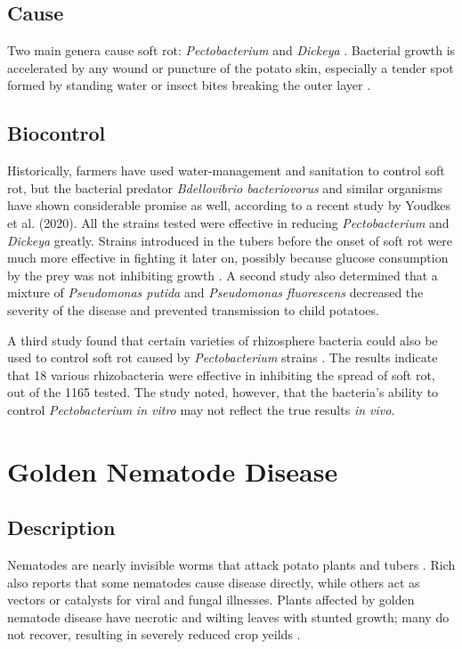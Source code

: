 \documentclass[letterpaper, 12pt]{report}
\begin{document}
\subsection{Cause}

Two main genera cause soft rot: \emph{Pectobacterium} and \emph{Dickeya} \autocite{youdkes2020potential}. Bacterial growth is accelerated by any wound or puncture of the potato skin, especially a tender spot formed by standing water or insect bites breaking the outer layer \autocite{rich2013potato}.

\subsection{Biocontrol}

Historically, farmers have used water-management and sanitation to control soft rot, but the bacterial predator \emph{Bdellovibrio bacteriovorus} and similar organisms have shown considerable promise as well, according to a recent study by Youdkes et al. (2020). All the strains tested were effective in reducing \emph{Pectobacterium} and \emph{Dickeya} greatly. Strains introduced in the tubers before the onset of soft rot were much more effective in fighting it later on, possibly because glucose consumption by the prey was not inhibiting growth \autocite{youdkes2020potential}. A second study also determined that a mixture of \emph{Pseudomonas putida} and \emph{Pseudomonas fluorescens} decreased the severity of the disease and prevented transmission to child potatoes.

A third study found that certain varieties of rhizosphere bacteria could also be used to control soft rot caused by \emph{Pectobacterium} strains \autocite{krzyzanowska2012rhizosphere}. The results indicate that 18 various rhizobacteria were effective in inhibiting the spread of soft rot, out of the 1165 tested. The study noted, however, that the bacteria's ability to control \emph{Pectobacterium} \emph{in vitro} may not reflect the true results \emph{in vivo}.


\section{Golden Nematode Disease}

\subsection{Description}

Nematodes are nearly invisible worms that attack potato plants and tubers \autocite{rich2013potato}. Rich also reports that some nematodes cause disease directly, while others act as vectors or catalysts for viral and fungal illnesses. Plants affected by golden nematode disease have necrotic and wilting leaves with stunted growth; many do not recover, resulting in severely reduced crop yeilds \autocite{rich2013potato}.
\end{document}
